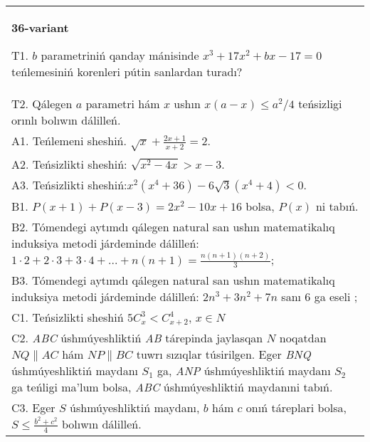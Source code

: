 \documentclass{article}
\begin{document}
\begin{tabular}{m{17cm}}
\textbf{36-variant}
\newline

T1. \(b\) parametriniń qanday mánisinde \(x^{3} + 17x^{2} + bx - 17 = 0\) teńlemesiniń korenleri pútin sanlardan turadı? \\
T2. Qálegen \(a\) parametri hám \(x\) ushın \(x(a - x) \leq a^{2}/4\) teńsizligi orınlı bolıwın dálilleń. \\
A1. Teńlemeni sheshiń. \(\sqrt{x} + \frac{2x + 1}{x + 2} = 2\). \\
A2. Teńsizlikti sheshiń: \(\sqrt{x^{2} - 4x} > x - 3\). \\
A3. Teńsizlikti sheshiń:\(x^{2}\left( x^{4} + 36 \right) - 6\sqrt{3}\left( x^{4} + 4 \right) < 0\). \\
B1. \(P(x + 1) + P(x - 3) = 2x^{2} - 10x + 16\) bolsa, \(P(x)\) ni tabıń. \\
B2. Tómendegi aytımdı qálegen natural san ushın matematikalıq induksiya metodi járdeminde dálilleń: \(1 \cdot 2 + 2 \cdot 3 + 3 \cdot 4 + ... + n(n + 1) = \frac{n(n + 1)(n + 2)}{3}\); \\
B3. Tómendegi aytımdı qálegen natural san ushın matematikalıq induksiya metodi járdeminde dálilleń: \(2n^{3} + 3n^{2} + 7n\) sanı 6 ga eseli ; \\
C1. Teńsizlikti sheshiń \(5C_{x}^{3} < C_{x + 2}^{4}\), \(x \in N\) \\
C2. \emph{ABC} úshmúyeshliktiń \emph{AB} tárepinda jaylasqan \(N\) noqatdan \(NQ\| AC\) hám \(NP\| BC\) tuwrı sızıqlar túsirilgen. Eger \emph{BNQ} úshmúyeshliktiń maydanı \(S_{1}\) ga, \emph{ANP} úshmúyeshliktiń maydanı \(S_{2}\) ga teńligi ma'lum bolsa, \emph{ABC} úshmúyeshliktiń maydanıni tabıń. \\
C3. Eger \(S\) úshmúyeshliktiń maydanı, \(b\) hám \(c\) onıń táreplari bolsa, \(S \leq \frac{b^{2} + c^{2}}{4}\) bolıwın dálilleń. \\

\end{tabular}
\vspace{1cm}
\end{document}
